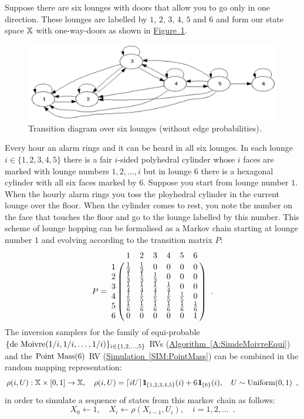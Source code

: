 \begin{example}\label{EX:SixLounges}  Suppose there are six lounges with  doors that allow you to go only in one direction.  These lounges are labelled by $1$, $2$, $3$, $4$, $5$ and $6$ and form our state space $\mathbb{X}$ with one-way-doors as shown in \hyperref[F:SixLounges]{Figure~\ref*{F:SixLounges}}.  
\begin{figure}[htbp]
\caption{Transition diagram over six lounges (without edge probabilities).\label{F:SixLounges}}
\centering \mbox{\includegraphics[width=4.5in]{figures/SixLounges}} 
\end{figure}
Every hour an alarm rings and it can be heard in all six lounges.  In each lounge $i \in \{1,2,3,4,5\}$ there is a fair $i$-sided polyhedral cylinder whose $i$ faces are marked with lounge numbers $1,2,\ldots,i$ but in lounge $6$ there is a hexagonal cylinder with all six faces marked by $6$.  Suppose you start from lounge number $1$.  When the hourly alarm rings you toss the ployhedral cylinder in the current lounge over the floor.  When the cylinder comes to rest, you note the number on the face that touches the floor and go to the lounge labelled by this number.  
This scheme of lounge hopping can be formalised as a Markov chain starting at lounge number $1$ and evolving according to the  transition matrix $P$:
$$P = 
\bordermatrix{ ~ & 1 & 2 & 3 &  4 & 5 & 6 \cr 
1 & \frac{1}{2} & \frac{1}{2} & 0 & 0 & 0 & 0 \cr
2 & \frac{1}{3} & \frac{1}{3} & \frac{1}{3} & 0 & 0 & 0 \cr
3 & \frac{1}{4} & \frac{1}{4} & \frac{1}{4} & \frac{1}{4} & 0 & 0 \cr
4 & \frac{1}{5} & \frac{1}{5} & \frac{1}{5} & \frac{1}{5} & \frac{1}{5} & 0 \cr
5 & \frac{1}{6} & \frac{1}{6} & \frac{1}{6} & \frac{1}{6} & \frac{1}{6} & \frac{1}{6} \cr
6 & 0 & 0 & 0 & 0 & 0 & 1 } \enspace .
$$
The inversion samplers for the family of equi-probable $\{\mbox{{\rm de~Moivre}}(1/i,1/i,\ldots,1/i)\}_{i \in \{1,2,\ldots,5\}}$ RVs (\hyperref[A:SimdeMoivreEqui]{Algorithm~\ref*{A:SimdeMoivreEqui}}) and the $\mbox{{\rm Point~Mass}}(6)$ RV (\hyperref[SIM:PointMass]{Simulation~\ref*{SIM:PointMass}}) can be combined in the random mapping representation:
$$
 \rho(i,U): \mathbb{X} \times [0,1] \to \mathbb{X}, \quad \rho(i,U) = \lceil i U \rceil \, {1}\mspace{-11 mu}{1}_{\{1,2,3,4,5\}} (i) + 6 \, {1}\mspace{-11 mu}{1}_{\{6\}}(i), \quad U \sim \mbox{{\rm Uniform}}(0,1) \enspace ,$$
in order to simulate a sequence of states from this markov chain as follows:
\begin{equation}\label{E:SimulateSixLounges}
X_0 \gets 1, \quad X_i \gets \rho(X_{i-1},U_i), \quad i=1,2,\ldots \enspace .
\end{equation}
\end{example}

